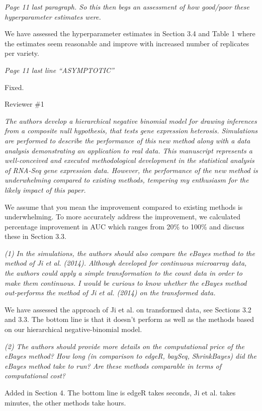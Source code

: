 \documentclass{article}
\newcommand{\comment}[1]{\textit{#1}}
\newcommand{\response}[1]{#1}
\begin{document}
\comment{Page 11 last paragraph.  So this then begs an assessment of how good/poor these hyperparameter estimates were.}

\response{We have assessed the hyperparameter estimates in Section 3.4 and Table 1 where the estimates seem reasonable and improve with increased number of replicates per variety.}

\comment{Page 11 last line “ASYMPTOTIC”}

\response{Fixed.}

Reviewer \#1

\comment{The authors develop a hierarchical negative binomial model for drawing inferences from a composite null hypothesis, that tests gene expression heterosis. Simulations are performed to describe the performance of this new method along with a data analysis demonstrating an application to real data. This manuscript represents a well-conceived and executed methodological development in the statistical analysis of RNA-Seq gene expression data. However, the performance of the new method is underwhelming compared to existing methods, tempering my enthusiasm for the likely impact of this paper.}

\response{We assume that you mean the improvement compared to existing methods is underwhelming. To more accurately address the improvement, we calculated percentage improvement in AUC which ranges from 20\% to 100\% and discuss these in Section 3.3.}

\comment{(1) In the simulations, the authors should also compare the eBayes method to the method of Ji et al. (2014). Although developed for continuous microarray data, the authors could apply a simple transformation to the count data in order to make them continuous. I would be curious to know whether the eBayes method out-performs the method of Ji et al. (2014) on the transformed data.}

\response{We have assessed the approach of Ji et al. on transformed data, see Sections 3.2 and 3.3. The bottom line is that it doesn't perform as well as the methods based on our hierarchical negative-binomial model.}

\comment{(2) The authors should provide more details on the computational price of the eBayes method? How long (in comparison to edgeR, baySeq, ShrinkBayes) did the eBayes method take to run? Are these methods comparable in terms of computational cost?}

\response{Added in Section 4. The bottom line is edgeR takes seconds, Ji et al. takes minutes, the other methods take hours.}
\end{document}

